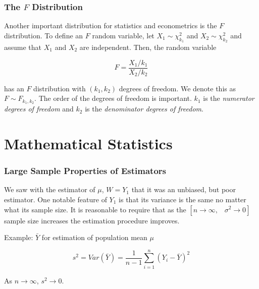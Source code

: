 \documentclass[12pt]{beamer}
\begin{document}
\begin{frame}
\frametitle{The $F$ Distribution}
Another important distribution for statistics and econometrics is the $F$ distribution. To define an $F$
random variable, let $X_{1} \sim \chi_{k_{1}}^{2}$ and $X_{2} \sim \chi_{k_{2}}^{2}$ and assume that $X_{1}$ and
$X_{2}$ are independent. Then, the random variable

\begin{equation*}
F = \frac{X_{1}/k_{1}}{X_{2}/k_{2}}
\end{equation*}

has an $F$ distribution with $(k_{1}, k_{2})$ degrees of freedom. We denote this as $F \sim F_{k_{1}, k_{2}}$. The 
order of the degrees of freedom is important. $k_{1}$ is the \emph{numerator degrees of freedom} and $k_{2}$ is 
the \emph{denominator degrees of freedom}.
\end{frame}


\section{Mathematical Statistics}
\begin{frame}
\frametitle{Large Sample Properties of Estimators}
We saw with the estimator of $\mu$, $W = Y_{1}$ that it was an unbiased, but poor estimator. One notable
feature of $Y_{1}$ is that its variance is the same no matter what its sample size. It is reasonable to 
require that as the $\left[n \rightarrow \infty \mbox{,} \quad \sigma^{2} \rightarrow 0\right]$ sample size increases
the estimation procedure improves.

\vspace{5mm}
Example: $\bar{Y}$ for estimation of population mean $\mu$

\begin{equation*}
s^{2} = Var(\bar{Y}) = \frac{1}{n-1} \sum\limits_{i=1}^{n} (Y_{i} - \bar{Y})^{2}
\end{equation*}

\vspace{5mm}
As $n \rightarrow \infty$, $s^{2} \rightarrow 0$.
\end{frame}
\end{document}
